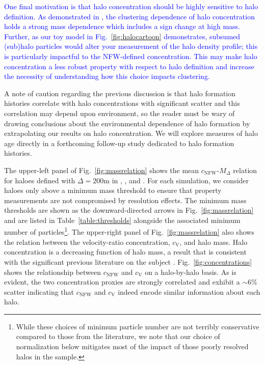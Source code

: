 \documentclass[usenatbib,fleqn]{mnras}
\begin{document}
\textcolor{blue}{One final motivation is that halo concentration should be highly sensitive to halo definition. As demonstrated in \citet{wechsler_etal02}, the clustering dependence of halo concentration holds a strong mass dependence which includes a sign change at high mass. Further, as our toy model in Fig.~\ref{fig:halocartoon} demonstrates, subsumed (sub)halo particles would alter your measurement of the halo density profile; this is particularly impactful to the NFW-defined concentration. This may make halo concentration a less robust property with respect to halo definition and increase the necessity of understanding how this choice impacts clustering.}

A note of caution regarding the previous discussion is that halo formation histories correlate with halo concentrations with significant scatter and this correlation may depend upon environment, so the reader must be wary of drawing conclusions about the environmental dependence of halo formation by extrapolating our results on halo concentration. We will explore measures of halo age directly in a forthcoming follow-up study dedicated to halo formation histories.

The upper-left panel of Fig.~\ref{fig:massrelation} shows the mean $c_{\mathrm{NFW}}$-$M_{\Delta}$ relation for haloes defined with $\Delta=200$m in \simA, \simB, and \simC. For each simulation, we consider haloes only above a minimum mass threshold to ensure that property measurements are not compromised by resolution effects. The minimum mass thresholds are shown as the downward-directed arrows in Fig.~\ref{fig:massrelation} and are listed in Table~\ref{table:thresholds} alongside the associated minimum number of particles\footnote{While these choices of minimum particle number are not terribly conservative compared to those from the literature, we note that our choice of normalization below mitigates most of the impact of those poorly resolved halos in the sample.}. The upper-right panel of Fig.~\ref{fig:massrelation} also shows the relation between the velocity-ratio concentration, $c_{\mathrm{V}}$, and halo mass. Halo concentration is a decreasing function of halo mass, a result that is consistent with the significant previous literature on the subject \citep[e.g.,][and references therein]{bullock_etal01, maccio_etal07,duffy_etal08,prada_etal12,klypin_etal16}.  Fig.~\ref{fig:concentrations} shows the relationship between $c_{\mathrm{NFW}}$ and $c_{\mathrm{V}}$ on a halo-by-halo basis. As is evident, the two concentration proxies are strongly correlated and exhibit a $\sim 6\%$ scatter indicating that $c_{\mathrm{NFW}}$ and $c_{\mathrm{V}}$ indeed encode similar information about each halo.
\end{document}
